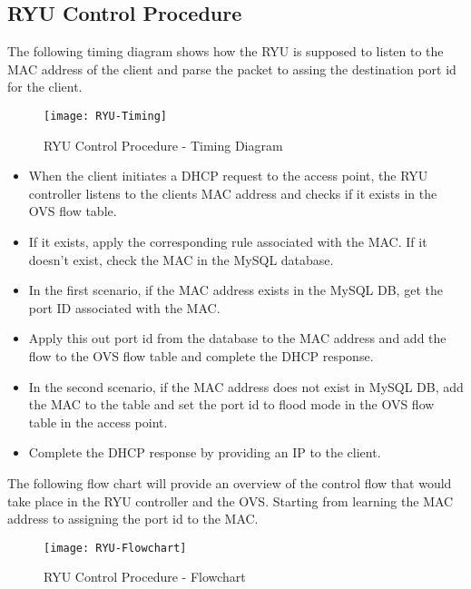 \subsection{RYU Control Procedure} \label{RYU Control Procedure}
The following timing diagram shows how the RYU is supposed to listen to the MAC address of the client and parse the packet to assing the destination port id for the client.

\begin{figure}[H]
	\centering
	\texttt{[image: RYU-Timing]}
	\caption {RYU Control Procedure - Timing Diagram }
	\label{fig:RYU-Timing}
	\vspace{-10pt}
\end{figure}

\begin{itemize}
	\item When the client initiates a DHCP request to the access point, the RYU controller listens to the clients MAC address and checks if it exists in the OVS flow table.
	\item If it exists, apply the corresponding rule associated with the MAC. If it doesn’t exist, check the MAC in the MySQL database.
	\item In the first scenario, if the MAC address exists in the MySQL DB, get the port ID associated with the MAC.
	\item Apply this out port id from the database to the MAC address and add the flow to the OVS flow table and complete the DHCP response.
	\item In the second scenario, if the MAC address does not exist in MySQL DB, add the MAC to the table and set the port id to flood mode in the OVS flow table in the access point.
	\item Complete the DHCP response by providing an IP to the client.
	
\end{itemize}
The following flow chart will provide an overview of the control flow that would take place in the RYU controller and the OVS. Starting from learning the MAC address to assigning the port id to the MAC.

\begin{figure}[H]
	\centering
	\texttt{[image: RYU-Flowchart]}
	\caption {RYU Control Procedure - Flowchart}
	\label{fig:RYU-Flowchart}
	\vspace{-10pt}
\end{figure}

